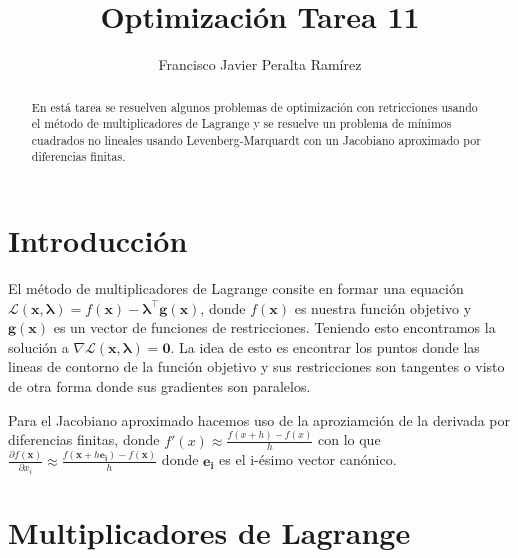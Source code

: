 \documentclass{article}
\title {Optimización Tarea 11}
\author {Francisco Javier Peralta Ramírez}
\begin{document}
\maketitle
\begin{abstract}
  En está tarea se resuelven algunos problemas de optimización con retricciones usando el método de multiplicadores de Lagrange y se resuelve un problema de mínimos cuadrados no lineales usando Levenberg-Marquardt con un Jacobiano aproximado por diferencias finitas.
\end{abstract}
\begin{multicols}{2}

\section{Introducción}

El método de multiplicadores de Lagrange consite en formar una equación $\mathcal{L}(\boldsymbol{x}, \boldsymbol{\lambda}) = f(\boldsymbol{x}) - \boldsymbol{\lambda}^\intercal \boldsymbol{g}(\boldsymbol{x})$, donde $f(\boldsymbol{x})$ es nuestra función objetivo y $\boldsymbol{g}(\boldsymbol{x})$ es un vector de funciones de restricciones. Teniendo esto encontramos la solución a $\nabla \mathcal{L}(\boldsymbol{x}, \boldsymbol{\lambda}) = \boldsymbol{0}$. La idea de esto es encontrar los puntos donde las lineas de contorno de la función objetivo y sus restricciones son tangentes o visto de otra forma donde sus gradientes son paralelos.

Para el Jacobiano aproximado hacemos uso de la aproziamción de la derivada por diferencias finitas, donde $f'(x) \approx \frac{f(x+h) - f(x)}{h}$ con lo que $\frac{\partial f(\boldsymbol{x})}{\partial x_i} \approx \frac{ f(\boldsymbol{x} + h\boldsymbol{e_i}) - f(\boldsymbol{x}) }{h}$ donde $\boldsymbol{e_i}$ es el i-ésimo vector canónico.

\section{Multiplicadores de Lagrange}


\end{multicols}
\end{document}

